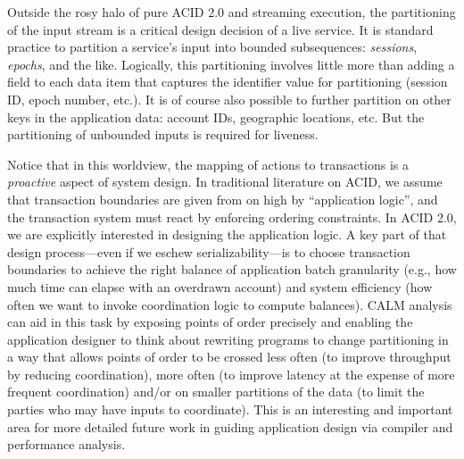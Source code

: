 \documentclass{sig-alternate}
\begin{document}
Outside the rosy halo of pure ACID 2.0 and streaming execution, the partitioning
of the input stream is a critical design decision of a live service.  It is
standard practice to partition a service's input into bounded subsequences:
\emph{sessions}, \emph{epochs}, and the like. Logically, this partitioning
involves little more than adding a field to each data item that captures the
identifier value for partitioning (session ID, epoch number, etc.).  It is of
course also possible to further partition on other keys in the application data:
account IDs, geographic locations, etc.  But the partitioning of unbounded
inputs is required for liveness.

Notice that in this worldview, the mapping of actions to transactions is a \emph{proactive} aspect of system design.  In traditional literature on ACID, we assume that transaction boundaries are given from on high by ``application logic'', and the transaction system must react by enforcing ordering constraints.  In ACID 2.0, we are explicitly interested in designing the application logic.  A key part of that design process---even if we eschew serializability---is to choose transaction boundaries to achieve the right balance of application batch granularity (e.g., how much time can elapse with an overdrawn account) and system efficiency (how often we want to invoke coordination logic to compute balances).  CALM analysis can aid in this task by exposing points of order precisely and enabling the application designer to think about rewriting programs to change partitioning in a way that allows points of order to be crossed less often (to improve throughput by reducing coordination), more often (to improve latency at the expense of more frequent coordination) and/or on smaller partitions of the data (to limit the parties who may have inputs to coordinate).  This is an interesting and important area for more detailed future work in guiding application design via compiler and performance analysis.
\end{document}
